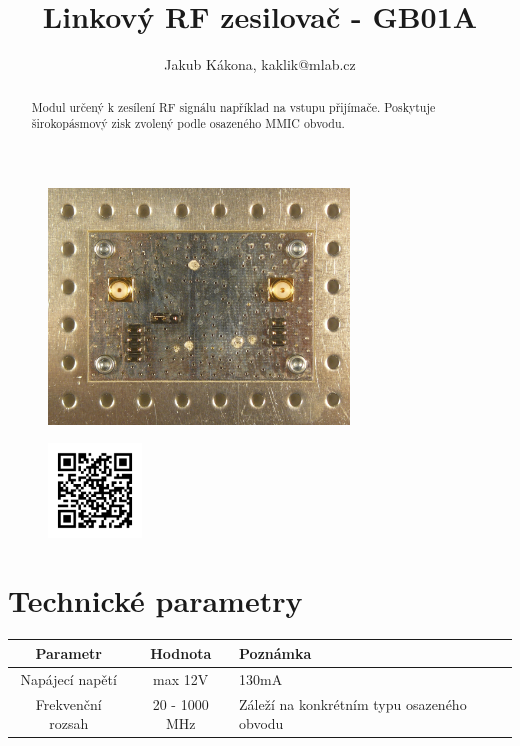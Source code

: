 \documentclass[12pt,a4paper,oneside]{article}
\begin{document}
\title{Linkový RF zesilovač - GB01A}
\author{Jakub Kákona, kaklik@mlab.cz}
\maketitle

\thispagestyle{empty}
\begin{abstract}
Modul určený k zesílení RF signálu například na vstupu přijímače.
Poskytuje širokopásmový zisk zvolený podle osazeného MMIC obvodu.
\end{abstract}

\begin{figure} [htbp]
\begin{center}
\includegraphics [width=80mm] {./img/GB01A_Top_Big.JPG} 
\end{center}
\end{figure}

\begin{figure} [b]
\includegraphics [width=25mm] {./img/GB01A_QRcode.png} 
\end{figure}

\newpage
\tableofcontents

\section{Technické parametry}
\begin{table}[htbp]
\begin{center}
\begin{tabular}{|c|c|p{4.7cm}|}
\hline
Parametr & Hodnota & Poznámka \\
\hline
Napájecí napětí  & max 12V &  130mA \\ 
\hline
Frekvenční rozsah  & 20 - 1000 MHz & Záleží na konkrétním typu osazeného obvodu \\ 
\hline
\end{tabular}
\end{center}
\end{table}
\end{document}
